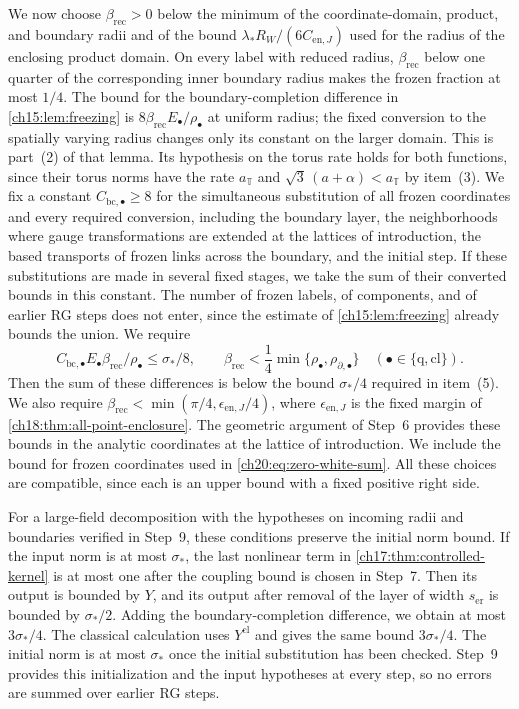 We now choose $\beta_{\mathrm{rec}}>0$ below the minimum of the coordinate-domain, product, and boundary radii and of the bound $\lambda_*R_W/(6C_{\mathrm{en},J})$ used for the radius of the enclosing product domain. On every label with reduced radius, $\beta_{\mathrm{rec}}$ below one quarter of the corresponding inner boundary radius makes the frozen fraction at most $1/4$. The bound for the boundary-completion difference in \cref{ch15:lem:freezing} is $8\beta_{\mathrm{rec}}E_\bullet/\rho_\bullet$ at uniform radius; the fixed conversion to the spatially varying radius changes only its constant on the larger domain. This is part~(2) of that lemma. Its hypothesis on the torus rate holds for both functions, since their torus norms have the rate $a_{\mathbb T}$ and $\sqrt3\,(a+\alpha)<a_{\mathbb T}$ by item~(3). We fix a constant $C_{\mathrm{bc},\bullet}\ge8$ for the simultaneous substitution of all frozen coordinates and every required conversion, including the boundary layer, the neighborhoods where gauge transformations are extended at the lattices of introduction, the based transports of frozen links across the boundary, and the initial step. If these substitutions are made in several fixed stages, we take the sum of their converted bounds in this constant. The number of frozen labels, of components, and of earlier RG steps does not enter, since the estimate of \cref{ch15:lem:freezing} already bounds the union. We require
\begin{equation}\label{ch20:eq:complete-freeze-budget}
 C_{\mathrm{bc},\bullet}E_\bullet\beta_{\mathrm{rec}}/\rho_\bullet\le\sigma_*/8,\qquad
 \beta_{\mathrm{rec}}<\frac14\min\{\rho_\bullet,\rho_{\partial,\bullet}\}\quad(\bullet\in\{\mathrm q,\mathrm{cl}\}).
\end{equation}
Then the sum of these differences is below the bound $\sigma_*/4$ required in item~(5). We also require $\beta_{\mathrm{rec}}<\min(\pi/4,\epsilon_{\mathrm{en},J}/4)$, where $\epsilon_{\mathrm{en},J}$ is the fixed margin of \cref{ch18:thm:all-point-enclosure}. The geometric argument of Step~6 provides these bounds in the analytic coordinates at the lattice of introduction. We include the bound for frozen coordinates used in \eqref{ch20:eq:zero-white-sum}. All these choices are compatible, since each is an upper bound with a fixed positive right side.

For a large-field decomposition with the hypotheses on incoming radii and boundaries verified in Step~9, these conditions preserve the initial norm bound. If the input norm is at most $\sigma_*$, the last nonlinear term in \cref{ch17:thm:controlled-kernel} is at most one after the coupling bound is chosen in Step~7. Then its output is bounded by $Y$, and its output after removal of the layer of width $s_{\mathrm{er}}$ is bounded by $\sigma_*/2$. Adding the boundary-completion difference, we obtain at most $3\sigma_*/4$. The classical calculation uses $Y^{\mathrm{cl}}$ and gives the same bound $3\sigma_*/4$. The initial norm is at most $\sigma_*$ once the initial substitution has been checked. Step~9 provides this initialization and the input hypotheses at every step, so no errors are summed over earlier RG steps.

